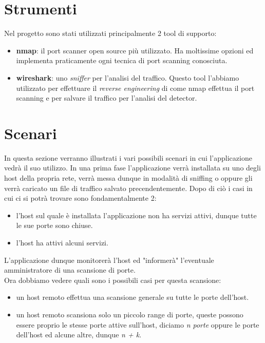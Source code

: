 \documentclass[a4paper,12pt]{article} %
\begin{document}
\section{Strumenti}

Nel progetto sono stati utilizzati principalmente 2 tool di supporto:

\begin{itemize}

\item \textbf{nmap}: il port scanner open source più utilizzato. Ha moltissime opzioni ed implementa praticamente 
ogni tecnica di port scanning conosciuta.

\item \textbf{wireshark}: uno \emph{sniffer} per l'analisi del traffico. Questo tool l'abbiamo utilizzato per effettuare
il \emph{reverse engineering} di come nmap effettua il port scanning e per salvare il traffico per l'analisi del detector.



\end{itemize}




\section{Scenari}

In questa sezione verranno illustrati i vari possibili scenari in cui l'applicazione vedrà il suo utilizzo. 
In una prima fase l'applicazione verrà installata su uno degli host della propria rete, verrà messa dunque in modalità di sniffing o oppure
gli verrà caricato un file di traffico salvato precendentemente. 
Dopo di ciò i casi in cui ci si potrà trovare sono fondamentalmente 2:

\begin{itemize}

\item l'host sul quale è installata l'applicazione non ha servizi attivi, dunque tutte le sue porte sono chiuse.

\item l'host ha attivi alcuni servizi.

\end{itemize}


L'applicazione dunque monitorerà l'host ed "informerà" l'eventuale amministratore di una scansione di porte.\\
Ora dobbiamo vedere quali sono i possibili casi per questa scansione:


\begin{itemize}

\item un host remoto effettua una scansione generale su tutte le porte dell'host.

\item un host remoto scansiona solo un piccolo range di porte, queste possono essere proprio le stesse porte attive sull'host, diciamo 
\emph{n porte} oppure le porte dell'host ed alcune altre, dunque \emph{n + k}.

\end{itemize}
\end{document}

